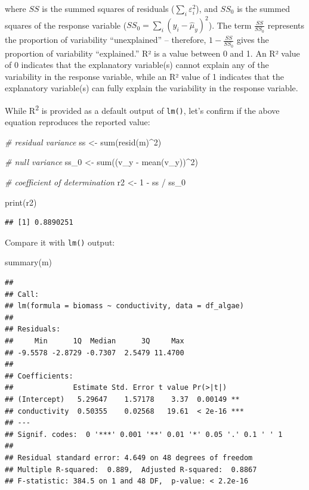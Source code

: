 \documentclass[
]{book}
\newenvironment{Shaded}{\begin{snugshade}}{\end{snugshade}}
\newcommand{\CommentTok}[1]{\textcolor[rgb]{0.56,0.35,0.01}{\textit{#1}}}
\newcommand{\DecValTok}[1]{\textcolor[rgb]{0.00,0.00,0.81}{#1}}
\newcommand{\FunctionTok}[1]{\textcolor[rgb]{0.00,0.00,0.00}{#1}}
\newcommand{\NormalTok}[1]{#1}
\newcommand{\OtherTok}[1]{\textcolor[rgb]{0.56,0.35,0.01}{#1}}
\newcommand{\SpecialCharTok}[1]{\textcolor[rgb]{0.00,0.00,0.00}{#1}}
\begin{document}
where \(SS\) is the summed squares of residuals (\(\sum_i \varepsilon_i^2\)), and \(SS_0\) is the summed squares of the response variable (\(SS_0 = \sum_i(y_i - \hat{\mu}_y)^2\)). The term \(\frac{SS}{SS_0}\) represents the proportion of variability ``unexplained'' -- therefore, \(1 - \frac{SS}{SS_0}\) gives the proportion of variability ``explained.'' R² is a value between 0 and 1. An R² value of 0 indicates that the explanatory variable(s) cannot explain any of the variability in the response variable, while an R² value of 1 indicates that the explanatory variable(s) can fully explain the variability in the response variable.

While R\textsuperscript{2} is provided as a default output of \texttt{lm()}, let's confirm if the above equation reproduces the reported value:

\begin{Shaded}
\begin{Highlighting}[]
\CommentTok{\# residual variance}
\NormalTok{ss }\OtherTok{\textless{}{-}} \FunctionTok{sum}\NormalTok{(}\FunctionTok{resid}\NormalTok{(m)}\SpecialCharTok{\^{}}\DecValTok{2}\NormalTok{)}

\CommentTok{\# null variance}
\NormalTok{ss\_0 }\OtherTok{\textless{}{-}} \FunctionTok{sum}\NormalTok{((v\_y }\SpecialCharTok{{-}} \FunctionTok{mean}\NormalTok{(v\_y))}\SpecialCharTok{\^{}}\DecValTok{2}\NormalTok{)}

\CommentTok{\# coefficient of determination}
\NormalTok{r2 }\OtherTok{\textless{}{-}} \DecValTok{1} \SpecialCharTok{{-}}\NormalTok{ ss }\SpecialCharTok{/}\NormalTok{ ss\_0}

\FunctionTok{print}\NormalTok{(r2)}
\end{Highlighting}
\end{Shaded}

\begin{verbatim}
## [1] 0.8890251
\end{verbatim}

Compare it with \texttt{lm()} output:

\begin{Shaded}
\begin{Highlighting}[]
\FunctionTok{summary}\NormalTok{(m)}
\end{Highlighting}
\end{Shaded}

\begin{verbatim}
## 
## Call:
## lm(formula = biomass ~ conductivity, data = df_algae)
## 
## Residuals:
##     Min      1Q  Median      3Q     Max 
## -9.5578 -2.8729 -0.7307  2.5479 11.4700 
## 
## Coefficients:
##              Estimate Std. Error t value Pr(>|t|)    
## (Intercept)   5.29647    1.57178    3.37  0.00149 ** 
## conductivity  0.50355    0.02568   19.61  < 2e-16 ***
## ---
## Signif. codes:  0 '***' 0.001 '**' 0.01 '*' 0.05 '.' 0.1 ' ' 1
## 
## Residual standard error: 4.649 on 48 degrees of freedom
## Multiple R-squared:  0.889,  Adjusted R-squared:  0.8867 
## F-statistic: 384.5 on 1 and 48 DF,  p-value: < 2.2e-16
\end{verbatim}
\end{document}
